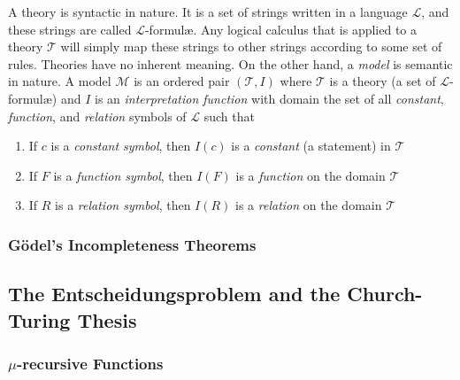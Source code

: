 A theory is syntactic in nature. It is a set of strings written in a language $\mathcal{L}$, and these strings are called $\mathcal{L}$-formul{\ae}. Any logical calculus that is applied to a theory $\mathcal{T}$ will simply map these strings to other strings according to some set of rules. Theories have no inherent meaning. On the other hand, a \textit{model} is semantic in nature. A model $\mathcal{M}$ is an ordered pair $(\mathcal{T},I)$ where $\mathcal{T}$ is a theory (a set of $\mathcal{L}$-formul{\ae}) and $I$ is an \textit{interpretation function} with domain the set of all \textit{constant}, \textit{function}, and \textit{relation} symbols of $\mathcal{L}$ such that

\begin{enumerate}
	\item If $c$ is a \textit{constant symbol}, then $I(c)$ is a \textit{constant} (a statement) in $\mathcal{T}$
	\item If $F$ is a \textit{function symbol}, then $I(F)$ is a \textit{function} on the domain $\mathcal{T}$
	\item If $R$ is a \textit{relation symbol}, then $I(R)$ is a \textit{relation} on the domain $\mathcal{T}$
\end{enumerate}

\subsubsection{G\"odel's Incompleteness Theorems}







\subsection{The Entscheidungsproblem and the Church-Turing Thesis}

\subsubsection{$\mu$-recursive Functions}


